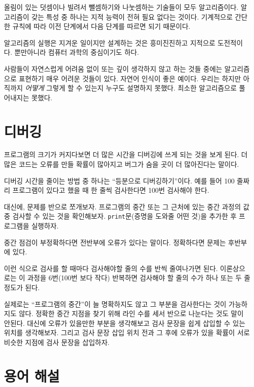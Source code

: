 \documentclass[10pt]{book}
\begin{document}
올림이 있는 덧셈이나 빌려서 뺄셈하기와 나눗셈하는 기술들이 모두
알고리즘이다.  알고리즘이 갖는 특성 중 하나는 지적 능력이 전혀 필요
없다는 것이다.  기계적으로 간단한 규칙에 따라 이전 단계에서 다음 단계를
따르면 되기 때문이다.

알고리즘의 실행은 지겨운 일이지만 설계하는 것은 흥미진진하고 지적으로
도전적이다.  뿐만아니라 컴퓨터 과학의 중심이기도 하다.

사람들이 자연스럽게 어려움 없이 또는 깊이 생각하지 않고 하는 것들
중에는 알고리즘으로 표현하기 매우 어려운 것들이 있다.  자연어 인식이
좋은 예이다.  우리는 하지만 아직까지 {\em 어떻게} 그렇게 할 수 있는지
누구도 설명하지 못했다.  최소한 알고리즘으로 풀어내지는 못했다.



\section{디버깅}
\label{bisectbug}

프로그램의 크기가 커지다보면 더 많은 시간을 디버깅에 쓰게 되는 것을
보게 된다.  더 많은 코드는 오류를 만들 확률이 많아지고 버그가 숨을 곳이
더 많아진다는 말이다.

디버깅 시간을 줄이는 방법 중 하나는 ``등분으로 디버깅하기''이다.  예를
들어 100 줄짜리 프로그램이 있다고 했을 때 한 줄씩 검사한다면 100번
검사해야 한다.

대신에, 문제를 반으로 쪼개보자.  프로그램의 중간 또는 그 근처에 있는
중간 과정의 값 중 검사할 수 있는 것을 확인해보자.  {\tt print}문(증명을
도와줄 어떤 것)을 추가한 후 프로그램을 실행하자.


중간 점검이 부정확하다면 전반부에 오류가 있다는 말이다.  정확하다면
문제는 후반부에 있다. 

이런 식으로 검사를 할 때마다 검사해야할 줄의 수를 반씩 줄여나가면
된다.  이론상으로는 이 과정을 6번(100번 보다 작다) 반복하면 검사해야 할
줄의 수가 하나 또는 두 줄 정도가 된다.

실제로는 ``프로그램의 중간''이 늘 명확하지도 않고 그 부분을 검사한다는
것이 가능하지도 않다.  정확한 중간 지점을 찾기 위해 라인 수를 세서
반으로 나눈다는 것도 말이 안된다.  대신에 오류가 있을만한 부분을
생각해보고 검사 문장을 쉽게 삽입할 수 있는 위치를 생각해보자.  그리고
검사 문장 삽입 위치 전과 그 후에 오류가 있을 확률이 서로 비슷한 지점에
검사 문장을 삽입하자.





\section{용어 해설}
\end{document}
